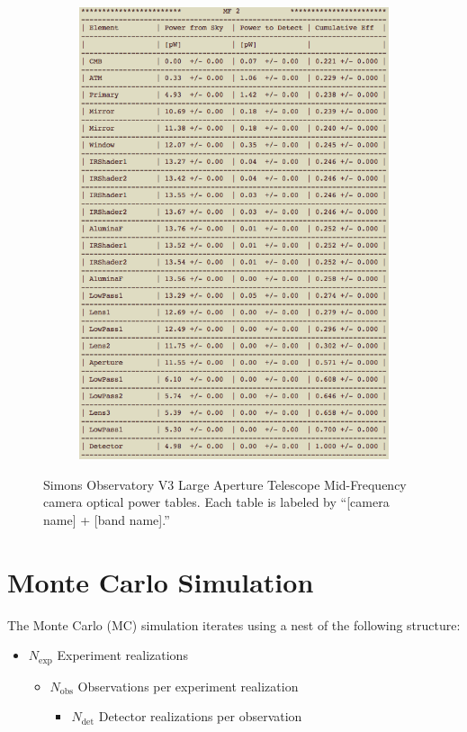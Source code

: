 \documentclass[11pt]{article} %
\begin{document}
\begin{figure}[h!]
\begin{subfigure}{0.49\linewidth}
		\includegraphics[width=1.0\linewidth]{Camera_optPowEx_2}
	\end{subfigure}
	\caption{Simons Observatory V3 Large Aperture Telescope Mid-Frequency camera optical power tables. Each table is labeled by ``[camera name] + [band name].'' \label{expSens}}
\end{figure}


\section{Monte Carlo Simulation}

The Monte Carlo (MC) simulation iterates using a nest of the following structure:

\begin{itemize}[noitemsep,topsep=0pt]
	\item $N_{\mathrm{exp}}$ Experiment realizations
		\begin{itemize}[noitemsep,topsep=0pt]
		\item $N_{\mathrm{obs}}$ Observations per experiment realization
			\begin{itemize}[noitemsep,topsep=0pt]
			\item $N_{\mathrm{det}}$ Detector realizations per observation
			\end{itemize}
		\end{itemize}
\end{itemize}
	
\end{document}
